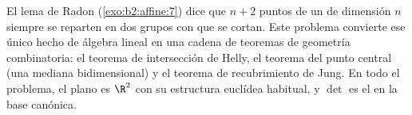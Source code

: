 \begin{problem}\label{pb:b2:affine:1}
El lema de Radon (\cref{exo:b2:affine:7}) dice que $n + 2$ puntos de
un  de dimensión $n$ siempre se reparten en dos grupos con
 que se cortan. Este problema convierte ese único
hecho de álgebra lineal en una cadena de teoremas de geometría
combinatoria: el teorema de intersección de Helly, el teorema del
punto central (una mediana bidimensional) y el teorema de
recubrimiento de Jung. En todo el problema, el plano es $\R^2$ con su
estructura euclídea habitual, y $\det$ es el  en la base
canónica.


\end{problem}
